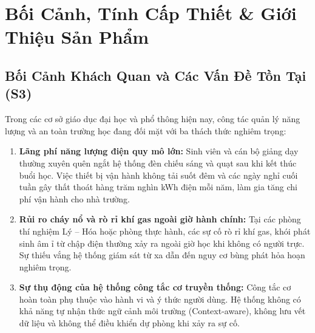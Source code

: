 \documentclass[12pt,a4paper]{article}
\begin{document}
\newpage
\tableofcontents
\vspace{0.8cm}
\listoffigures
\vspace{0.8cm}
\listoftables
\newpage

\section{Bối Cảnh, Tính Cấp Thiết \& Giới Thiệu Sản Phẩm}

\subsection{Bối Cảnh Khách Quan và Các Vấn Đề Tồn Tại (S3)}
Trong các cơ sở giáo dục đại học và phổ thông hiện nay, công tác quản lý năng lượng và an toàn trường học đang đối mặt với ba thách thức nghiêm trọng:
\begin{enumerate}
    \item \textbf{Lãng phí năng lượng điện quy mô lớn:} Sinh viên và cán bộ giảng dạy thường xuyên quên ngắt hệ thống đèn chiếu sáng và quạt sau khi kết thúc buổi học. Việc thiết bị vận hành không tải suốt đêm và các ngày nghỉ cuối tuần gây thất thoát hàng trăm nghìn kWh điện mỗi năm, làm gia tăng chi phí vận hành cho nhà trường.
    \item \textbf{Rủi ro cháy nổ và rò rỉ khí gas ngoài giờ hành chính:} Tại các phòng thí nghiệm Lý -- Hóa hoặc phòng thực hành, các sự cố rò rỉ khí gas, khói phát sinh âm ỉ từ chập điện thường xảy ra ngoài giờ học khi không có người trực. Sự thiếu vắng hệ thống giám sát từ xa dẫn đến nguy cơ bùng phát hỏa hoạn nghiêm trọng.
    \item \textbf{Sự thụ động của hệ thống công tắc cơ truyền thống:} Công tắc cơ hoàn toàn phụ thuộc vào hành vi và ý thức người dùng. Hệ thống không có khả năng tự nhận thức ngữ cảnh môi trường (Context-aware), không lưu vết dữ liệu và không thể điều khiển dự phòng khi xảy ra sự cố.
\end{enumerate}
\end{document}
